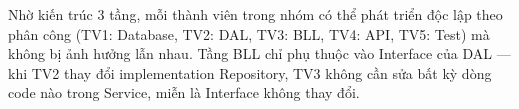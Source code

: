 Nhờ kiến trúc 3 tầng, mỗi thành viên trong nhóm có thể
phát triển độc lập theo phân công (TV1: Database, TV2: DAL,
TV3: BLL, TV4: API, TV5: Test) mà không bị ảnh hưởng lẫn
nhau. Tầng BLL chỉ phụ thuộc vào Interface của DAL — khi
TV2 thay đổi implementation Repository, TV3 không cần sửa
bất kỳ dòng code nào trong Service, miễn là Interface
không thay đổi.